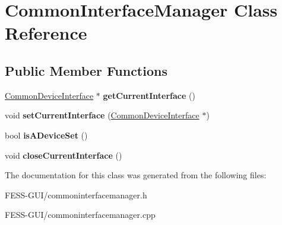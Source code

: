 \hypertarget{class_common_interface_manager}{}\section{Common\+Interface\+Manager Class Reference}
\label{class_common_interface_manager}
\subsection*{Public Member Functions}
\begin{DoxyCompactItemize}
\item 
\hypertarget{class_common_interface_manager_a24a72b0f78f9e6037e2da899e8170b2f}{}\label{class_common_interface_manager_a24a72b0f78f9e6037e2da899e8170b2f} 
\hyperlink{class_common_device_interface}{Common\+Device\+Interface} $\ast$ {\bfseries get\+Current\+Interface} ()
\item 
\hypertarget{class_common_interface_manager_add704853a060d8cca441da322b748c19}{}\label{class_common_interface_manager_add704853a060d8cca441da322b748c19} 
void {\bfseries set\+Current\+Interface} (\hyperlink{class_common_device_interface}{Common\+Device\+Interface} $\ast$)
\item 
\hypertarget{class_common_interface_manager_abd7a314803309cdb6789eaf36f90b7b7}{}\label{class_common_interface_manager_abd7a314803309cdb6789eaf36f90b7b7} 
bool {\bfseries is\+A\+Device\+Set} ()
\item 
\hypertarget{class_common_interface_manager_a16ab6917c45e1b40efe61d5379206ceb}{}\label{class_common_interface_manager_a16ab6917c45e1b40efe61d5379206ceb} 
void {\bfseries close\+Current\+Interface} ()
\end{DoxyCompactItemize}


The documentation for this class was generated from the following files\+:\begin{DoxyCompactItemize}
\item 
F\+E\+S\+S-\/\+G\+U\+I/commoninterfacemanager.\+h\item 
F\+E\+S\+S-\/\+G\+U\+I/commoninterfacemanager.\+cpp\end{DoxyCompactItemize}
